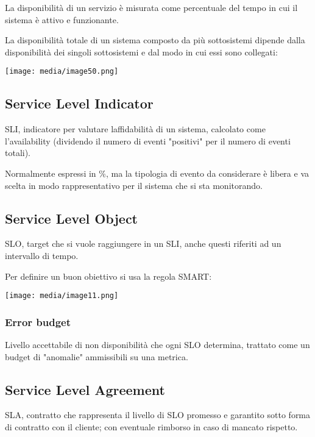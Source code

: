 La disponibilità di un servizio è misurata come percentuale del tempo in
cui il sistema è attivo e funzionante.

La disponibilità totale di un sistema composto da più sottosistemi
dipende dalla disponibilità dei singoli sottosistemi e dal modo in cui
essi sono collegati:

\texttt{[image: media/image50.png]}

\subsection{Service Level Indicator}\label{service-level-indicator}

SLI, indicatore per valutare l\textquotesingle affidabilità di un
sistema, calcolato come l'availability (dividendo il numero di eventi
"positivi" per il numero di eventi totali).

Normalmente espressi in \%, ma la tipologia di evento da considerare è
libera e va scelta in modo rappresentativo per il sistema che si sta
monitorando.

\subsection{Service Level Object}\label{service-level-object}

SLO, target che si vuole raggiungere in un SLI, anche questi riferiti ad
un intervallo di tempo.

Per definire un buon obiettivo si usa la regola SMART:

\texttt{[image: media/image11.png]}

\subsubsection{Error budget}\label{error-budget}

Livello accettabile di non disponibilità che ogni SLO determina,
trattato come un budget di "anomalie" ammissibili su una metrica.

\subsection{Service Level Agreement}\label{service-level-agreement}

SLA, contratto che rappresenta il livello di SLO promesso e garantito
sotto forma di contratto con il cliente; con eventuale rimborso in caso
di mancato rispetto.

